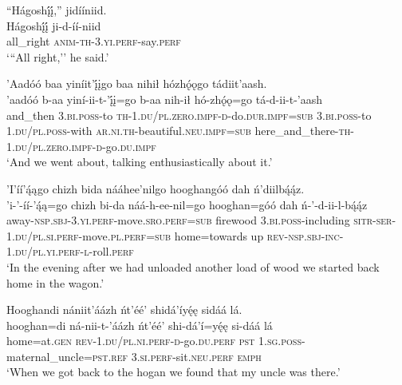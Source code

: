 \ea\label{ex:text1-13}
``Hágoshį́į́,'' jidííniid.\\
\gll Hágoshį́į́	ji-d-íí-niid\\
     all\_right	\textsc{anim}-\textsc{th}-3.\textsc{yi}.\textsc{perf}-say.\textsc{perf}\\
\glt `{``}All right,'' he said.'
\z

\ea\label{ex:text1-14-1}
’Aadóó baa yiníit’į́įgo baa nihił hózhǫ́ǫgo tádiit’aash.\\
\gll ’aadóó	b-aa	yiní-ii-t-’į́į=go	b-aa	nih-ił	hó-zhǫ́ǫ=go	tá-d-ii-t-’aash\\
     and\_then	3.\textsc{bi}.\textsc{poss}-to	\textsc{th}-1.\textsc{du}/\textsc{pl}.\textsc{zero}.\textsc{impf}-\textsc{d}-do.\textsc{dur}.\textsc{impf}=\textsc{sub}	3.\textsc{bi}.\textsc{poss}-to	1.\textsc{du}/\textsc{pl}.\textsc{poss}-with	\textsc{ar}.\textsc{ni}.\textsc{th}-beautiful.\textsc{neu}.\textsc{impf}=\textsc{sub}	here\_and\_there-\textsc{th}-1.\textsc{du}/\textsc{pl}.\textsc{zero}.\textsc{impf}-\textsc{d}-go.\textsc{du}.\textsc{impf}\\
\glt `And we went about, talking enthusiastically about it.'
\z

\ea\label{ex:text1-14-2}
’I’íí’ą́ągo chizh bida nááhee’nilgo hooghangóó dah ń’diilbą́ą́z.\\
\gll ’i-’-íí-’ą́ą=go	chizh	bi-da	náá-h-ee-nil=go	hooghan=góó	dah	ń-’-d-ii-l-bą́ą́z\\
     away-\textsc{nsp}.\textsc{sbj}-3.\textsc{yi}.\textsc{perf}-move.\textsc{sro}.\textsc{perf}=\textsc{sub}	firewood	3.\textsc{bi}.\textsc{poss}-including	\textsc{sitr}-\textsc{ser}-1.\textsc{du}/\textsc{pl}.\textsc{si}.\textsc{perf}-move.\textsc{pl}.\textsc{perf}=\textsc{sub}	home=towards	up	\textsc{rev}-\textsc{nsp}.\textsc{sbj}-\textsc{inc}-1.\textsc{du}/\textsc{pl}.\textsc{yi}.\textsc{perf}-\textsc{l}-roll.\textsc{perf}\\
\glt `In the evening after we had unloaded another load of wood we started back home in the wagon.'
\z

\ea\label{ex:text1-14-3}
Hooghandi nániit’áázh ńt’éé’ shidá’íyę́ę sidáá lá.\\
\gll hooghan=di	ná-nii-t-’áázh	ńt’éé’	shi-dá’í=yę́ę	si-dáá	lá\\
     home=at.\textsc{gen}	\textsc{rev}-1.\textsc{du}/\textsc{pl}.\textsc{ni}.\textsc{perf}-\textsc{d}-go.\textsc{du}.\textsc{perf}	\textsc{pst}	1.\textsc{sg}.\textsc{poss}-maternal\_uncle=\textsc{pst}.\textsc{ref}	3.\textsc{si}.\textsc{perf}-sit.\textsc{neu}.\textsc{perf}	\textsc{emph}\\
\glt `When we got back to the hogan we found that my uncle was there.'
\z

